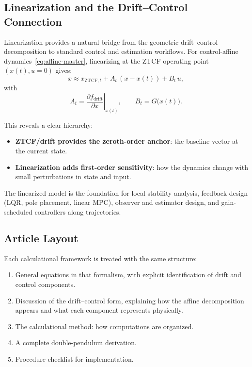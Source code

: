 \documentclass[11pt]{article}
\begin{document}
\subsection{Linearization and the Drift--Control Connection}\label{sec:linearization}

Linearization provides a natural bridge from the geometric drift--control decomposition to standard control and estimation workflows.
For control-affine dynamics~\eqref{eq:affine-master}, linearizing at the ZTCF operating point $(x(t), u = 0)$ gives:
\begin{equation}\label{eq:linearized}
\dot{x} \approx \dot{x}_{\mathrm{ZTCF},t} + A_t\,(x - x(t)) + B_t\,u,
\end{equation}
with
\begin{equation}
A_t = \left.\frac{\partial f_{\mathrm{drift}}}{\partial x}\right|_{x(t)}, \qquad B_t = G\bigl(x(t)\bigr).
\end{equation}

This reveals a clear hierarchy:
\begin{itemize}
\item \textbf{ZTCF/drift provides the zeroth-order anchor}: the baseline vector at the current state.
\item \textbf{Linearization adds first-order sensitivity}: how the dynamics change with small perturbations in state and input.
\end{itemize}

The linearized model is the foundation for local stability analysis, feedback design (LQR, pole placement, linear MPC), observer and estimator design, and gain-scheduled controllers along trajectories.


\subsection{Article Layout}

Each calculational framework is treated with the same structure:
\begin{enumerate}
\item General equations in that formalism, with explicit identification of drift and control components.
\item Discussion of the drift--control form, explaining how the affine decomposition appears and what each component represents physically.
\item The calculational method: how computations are organized.
\item A complete double-pendulum derivation.
\item Procedure checklist for implementation.
\end{enumerate}
\end{document}
